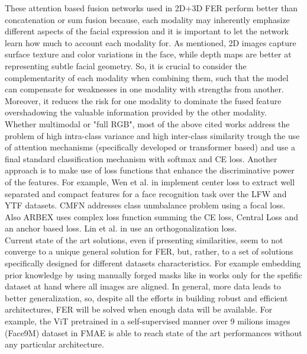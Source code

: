 These attention based fusion networks used in 2D+3D FER perform better than concatenation or sum fusion because, each modality may inherently emphasize different aspects of the facial expression and it is important to let the network learn how much to account each modality for. As mentioned, 2D images capture surface texture and color variations in the face, while depth maps are better at representing subtle facial geometry. So, it is crucial to consider the complementarity of each modality when combining them, such that the model can compensate for weaknesses in one modality with strengths from another. Moreover, it reduces the risk for one modality to dominate the fused feature overshadowing the valuable information provided by the other modality.\\

Whether multimodal or "full RGB", most of the above cited works address the problem of high intra-class variance and high inter-class similarity trough the use of attention mechanisms (specifically developed or transformer based) and use a final standard classification mechanism with softmax and CE loss. Another approach is to make use of loss functions that enhance the discriminative power of the features. For example, Wen et al. in \cite{center_loss} implement center loss to extract well separated and compact features for a face recognition task over the LFW \cite{LFW} and YTF \cite{YTF} datasets. CMFN \cite{RW_9_CMFN} addresses class unmbalance problem using a focal loss.\\ Also ARBEX \cite{RW_5_ARBEX} uses complex loss function summing the CE loss, Central Loss and an anchor based loss. Lin et al. in \cite{RW_10_OGFNET} use an orthogonalization loss.\\


Current state of the art solutions, even if presenting similarities, seem to not converge to a unique general solution for FER, but, rather, to a set of solutions specifically designed for different datasets characteristics. For example embedding prior knowledge by using manually forged masks like in \cite{RW_8A_AFNET} works only for the spefific dataset at hand where all images are aligned. In general, more data leads to better generalization, so, despite all the efforts in building robust and efficient architectures, FER will be solved when enough data will be available. For example, the ViT pretrained in a self-supervised manner over 9 milions images (Face9M) dataset in FMAE \cite{RW_12A_FMAE} is able to reach state of the art performances without any particular architecture.\\

